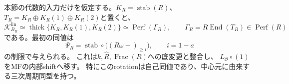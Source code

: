 \begin{theorem}\label{tw:thm:window}
本節の代数的入力だけを仮定する。$K_R=\operatorname{stab}(R)$、
$T_R=K_R\oplus K_R(1)\oplus K_R(2)$と置くと、
\begin{equation}\label{tw:eq:main}
 \mathcal K_{B_R}^{\mathrm{lin}}
 \simeq\operatorname{thick}\{K_R,K_R(1),K_R(2)\}
 \simeq\operatorname{Perf}(\Gamma_R),\qquad
 \Gamma_R=R\operatorname{End}(T_R)\in\operatorname{Perf}(R)
\end{equation}
である。最初の同値は
\begin{equation}\label{tw:eq:window}
 \Psi_R=\operatorname{stab}\circ\bigl((R\omega -)_{\ge i}\bigr),
 \qquad i=1-a
\end{equation}
の制限で与えられる。
これは$k,\widehat R,\operatorname{Frac}(R)$への底変更と整合し、
$L_{\mathcal O}\circ(1)$をMFの内部shiftへ移す。
特にこのrotationは自己同値であり、中心元に由来する三次周期同型を持つ。
\end{theorem}
